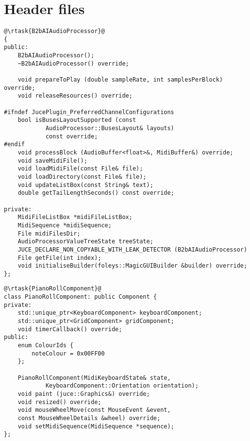 \appendix
\section{Header files}

\begin{verbatim}
@\rtask{B2bAIAudioProcessor}@
{
public:
    B2bAIAudioProcessor();
    ~B2bAIAudioProcessor() override;

    void prepareToPlay (double sampleRate, int samplesPerBlock) override;
    void releaseResources() override;

#ifndef JucePlugin_PreferredChannelConfigurations
    bool isBusesLayoutSupported (const 
            AudioProcessor::BusesLayout& layouts) 
            const override;
#endif
    void processBlock (AudioBuffer<float>&, MidiBuffer&) override;
    void saveMidiFile();
    void loadMidiFile(const File& file);
    void loadDirectory(const File& file);
    void updateListBox(const String& text);
    double getTailLengthSeconds() const override;

private:
    MidiFileListBox *midiFileListBox;
    MidiSequence *midiSequence;
    File midiFilesDir;
    AudioProcessorValueTreeState treeState;
    JUCE_DECLARE_NON_COPYABLE_WITH_LEAK_DETECTOR (B2bAIAudioProcessor)
    File getFile(int index);
    void initialiseBuilder(foleys::MagicGUIBuilder &builder) override;
};
\end{verbatim}

\begin{verbatim}
@\rtask{PianoRollComponent}@
class PianoRollComponent: public Component {
private:
    std::unique_ptr<KeyboardComponent> keyboardComponent;
    std::unique_ptr<GridComponent> gridComponent;
    void timerCallback() override;
public:
    enum ColourIds {
        noteColour = 0x00FF00
    };

    PianoRollComponent(MidiKeyboardState& state, 
            KeyboardComponent::Orientation orientation);
    void paint (juce::Graphics&) override;
    void resized() override;
    void mouseWheelMove(const MouseEvent &event, 
    const MouseWheelDetails &wheel) override;
    void setMidiSequence(MidiSequence *sequence);
};

\end{verbatim}

